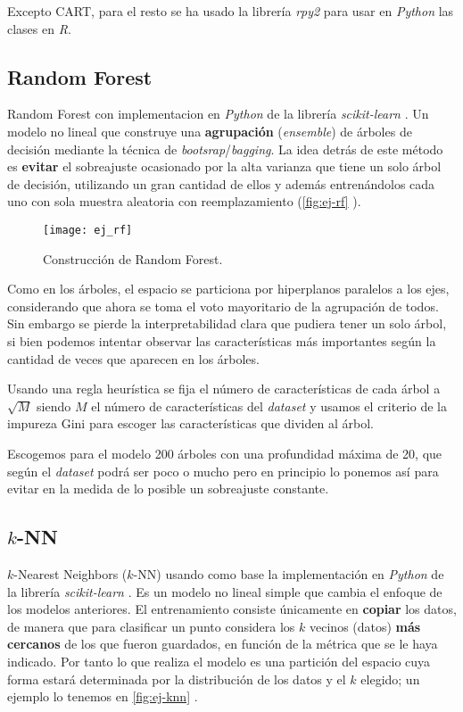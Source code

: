 Excepto CART, para el resto se ha usado la librería \emph{rpy2} \cite{gautier2020rpy2} para usar en \emph{Python} las clases en \emph{R}.

\subsection{Random Forest}

Random Forest \cite{ho1995random, breiman2001random} con implementacion en \emph{Python} de la librería \emph{scikit-learn} \cite{scikit2020rf}. Un modelo no lineal que construye una \textbf{agrupación} (\emph{ensemble}) de árboles de decisión mediante la técnica de \emph{bootsrap}/\emph{bagging}. La idea detrás de este método es \textbf{evitar} el sobreajuste ocasionado por la alta varianza que tiene un solo árbol de decisión, utilizando un gran cantidad de ellos y además entrenándolos cada uno con sola muestra aleatoria con reemplazamiento (\autoref{fig:ej-rf} \cite{orellana2018rf}).

\begin{figure}[htbp]
  \centering
  \texttt{[image: ej\_rf]}
  \caption{Construcción de Random Forest.}
  \label{fig:ej-rf}
\end{figure}

Como en los árboles, el espacio se particiona por hiperplanos paralelos a los ejes, considerando que ahora se toma el voto mayoritario de la agrupación de todos. Sin embargo se pierde la interpretabilidad clara que pudiera tener un solo árbol, si bien podemos intentar observar las características más importantes según la cantidad de veces que aparecen en los árboles.

Usando una regla heurística se fija el número de características de cada árbol a $\sqrt{M}$ siendo $M$ el número de características del \emph{dataset} y usamos el criterio de la impureza Gini \cite{rokach2005top} para escoger las características que dividen al árbol.

Escogemos para el modelo 200 árboles con una profundidad máxima de 20, que según el \emph{dataset} podrá ser poco o mucho pero en principio lo ponemos así para evitar en la medida de lo posible un sobreajuste constante.

\subsection{$k$-NN}

$k$-Nearest Neighbors ($k$-NN) \cite{cover1967nearest} usando como base la implementación en \emph{Python} de la librería \emph{scikit-learn} \cite{scikit2020knn}. Es un modelo no lineal simple que cambia el enfoque de los modelos anteriores. El entrenamiento consiste únicamente en \textbf{copiar} los datos, de manera que para clasificar un punto considera los $k$ vecinos (datos) \textbf{más cercanos} de los que fueron guardados, en función de la métrica que se le haya indicado. Por tanto lo que realiza el modelo es una partición del espacio cuya forma estará determinada por la distribución de los datos y el $k$ elegido; un ejemplo lo tenemos en \autoref{fig:ej-knn} \cite{sanjay2018knn}.

